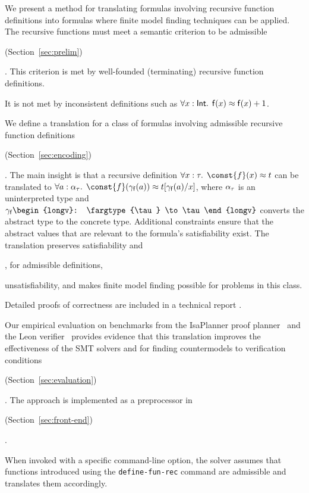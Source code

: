 We present a method for translating formulas involving recursive function
definitions into formulas where finite model finding techniques can be applied.
The recursive functions must meet a semantic criterion to be admissible\begin{nottinyv}
(Section~\ref{sec:prelim})\end{nottinyv}. This criterion is met by well-founded (terminating)
recursive function definitions. \begin{longv}It is not met by inconsistent
definitions such as $\forall x : {\mathsf{Int}}.\;\, \mathsf{f}(x) \approx \mathsf{f}(x) +
1$.\end{longv} %

We define a translation for a class of
formulas involving admissible recursive function definitions\begin{nottinyv}
(Section~\ref{sec:encoding})\end{nottinyv}. The main insight is that a
recursive definition $\forall x : \tau.\;\, \const{f}(x) \teq t$
can be translated to
$\forall a :
\fargtype{\tau}.\;\, \const{f}(\farg{\con{f}}(a)) \teq t[\farg{\con{f}}(a)/x]$, where
$\alpha_{\tau}$ is an uninterpreted  type and $\farg{\con{f}} \begin{longv}:
\fargtype{\tau} \to \tau\end{longv}$ converts the abstract type to the concrete
type. Additional constraints ensure that the abstract values that are relevant
to the formula's satisfiability
exist. The translation preserves satisfiability and\begin{longv}, for admissible definitions,\end{longv}
unsatisfiability, and makes finite model finding possible for problems in this
class.\begin{shortv} Detailed proofs of correctness are included in a technical
report \cite{our-report}.\end{shortv}

Our empirical evaluation on benchmarks from the IsaPlanner proof planner~\cite{DBLP:conf/itp/JohanssonDB10}
and the Leon verifier~\cite{blanc2013overview} provides
evidence that this translation improves the effectiveness of the SMT solvers
\cvc and \ziii for finding countermodels to verification conditions\begin{nottinyv}
(Section~\ref{sec:evaluation})\end{nottinyv}. The approach is implemented as a preprocessor
in \cvc \begin{nottinyv}(Section~\ref{sec:front-end})\end{nottinyv}. \begin{longv}%
When invoked with a specific
command-line option, the solver assumes that functions introduced using the
\texttt{define-fun-rec} command are admissible and translates them accordingly.\end{longv}

